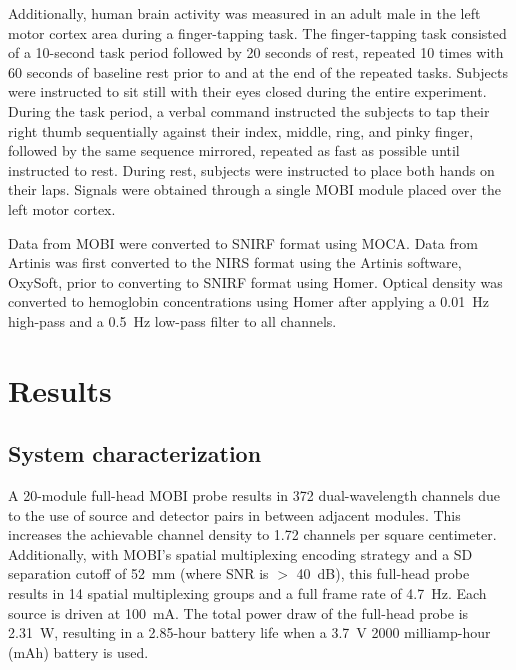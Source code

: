 Additionally, human brain activity was measured in an adult male in the left motor cortex area during a finger-tapping task. The finger-tapping task consisted of a 10-second task period followed by 20 seconds of rest, repeated 10 times with 60 seconds of baseline rest prior to and at the end of the repeated tasks. Subjects were instructed to sit still with their eyes closed during the entire experiment. During the task period, a verbal command instructed the subjects to tap their right thumb sequentially against their index, middle, ring, and pinky finger, followed by the same sequence mirrored, repeated as fast as possible until instructed to rest. During rest, subjects were instructed to place both hands on their laps. Signals were obtained through a single \ac{MOBI} module placed over the left motor cortex. 

Data from \ac{MOBI} were converted to \ac{SNIRF} format using MOCA. Data from Artinis was first converted to the \ac{NIRS} format using the Artinis software, OxySoft, prior to converting to \ac{SNIRF} format using Homer. Optical density was converted to hemoglobin concentrations using Homer after applying a 0.01~Hz high-pass and a 0.5~Hz low-pass filter to all channels. 



\section{Results}
\label{chap:mobi:results}
\subsection{System characterization}
A 20-module full-head \ac{MOBI} probe results in 372 dual-wavelength channels due to the use of source and detector pairs in between adjacent modules. This increases the achievable channel density to 1.72 channels per square centimeter. Additionally, with \ac{MOBI}'s spatial multiplexing encoding strategy and a \ac{SD} separation cutoff of 52~mm (where \ac{SNR} is $>$ 40~dB), this full-head probe results in 14 spatial multiplexing groups and a full frame rate of 4.7~Hz. Each source is driven at 100~mA. The total power draw of the full-head probe is 2.31~W, resulting in a 2.85-hour battery life when a 3.7~V 2000 milliamp-hour (mAh) battery is used.

